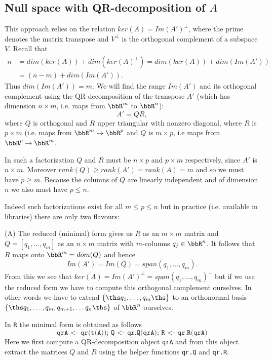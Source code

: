 \subsection{Null space with QR-decomposition of $A$}

This approach relies on the relation $ker(A)=Im(A')^\perp$, where the prime denotes the
matrix transpose and $V^\perp$ is the orthogonal complement of a subspace $V$.
Recall that
%
\begin{align*}
n&=dim(ker(A))+dim(ker(A)^\perp)=dim(ker(A))+dim(Im(A'))
\\&=
(n-m)+dim(Im(A')).
\end{align*}
%
Thus $dim(Im(A'))=m$.
We will find the range $Im(A')$ and its orthogonal complement using the QR-decomposition
of the transpose $A'$ (which has dimension $n\times m$, i.e. maps from $\bbR^m$ to $\bbR^n$):
%
\begin{equation}
\label{QR_A}
A'=QR,
\end{equation}
%
where $Q$ is orthogonal and $R$ upper triangular with nonzero diagonal, where
$R$ is $p\times m$ (i.e. maps from $\bbR^m\to\bbR^p$ and $Q$ is $m\times p$,
i.e maps from $\bbR^p\to\bbR^m$.

In such a factorization $Q$ and $R$ must be $n\times p$ and $p\times m$ respectively,
since $A'$ is $n\times m$. Moreover $rank(Q)\geq rank(A')=rank(A)=m$ and so we must 
have $p\geq m$. Because the columns of $Q$ are linearly independent and of dimension $n$
we also must have $p\leq n$.

Indeed such factorizations exist for all $m\leq p\leq n$ but in practice (i.e. available
in libraries) there are only two flavours:

\medskip\noindent
(A) The reduced (minimal) form gives us $R$ as an $m\times m$ matrix
and $Q=[q_1,\dots,q_m]$ as an $n\times m$ matrix with $m$-columns $q_j\in\bbR^n$.
It follows that $R$ maps onto $\bbR^m=dom(Q)$ and hence 
$$
Im(A')=Im(Q)=span(q_1,\dots,q_m).
$$
From this we see that $ker(A)=Im(A')^\perp=span(q_1,\dots,q_m)^\perp$ but if we
use the reduced form we have to compute this orthogonal complement ourselves.
In other words we have to extend $\{\ths q_1,\dots,q_m\ths\}$ to an orthonormal basis
$\{\ths q_1,\dots,q_m,q_{m+1},\dots q_n\ths\}$ of $\bbR^n$ ourselves.

\smallskip\noindent
In \texttt{R} the minimal form is obtained as follows
$$
\texttt{qrA <- qr(t(A));\ Q <- qr.Q(qrA);\ R <- qr.R(qrA)}
$$
Here we first compute a QR-decomposition object \texttt{qrA} and from this object 
extract the matrices $Q$ and $R$ using the helper functions \texttt{qr.Q} and
\texttt{qr.R}.


